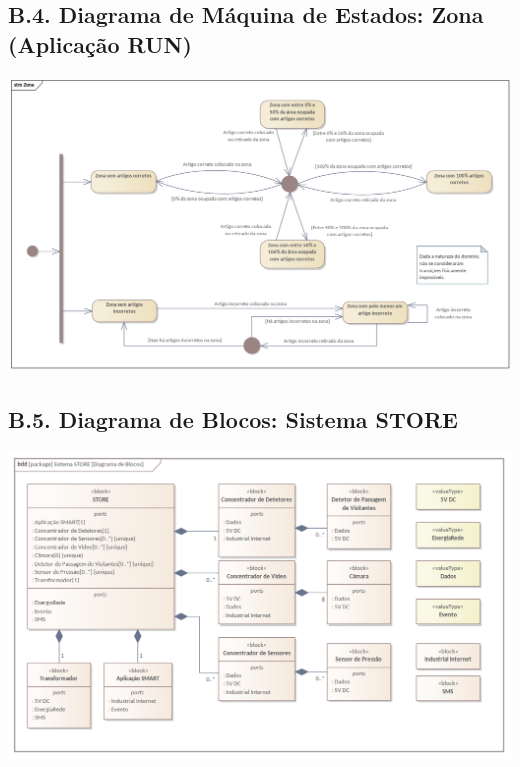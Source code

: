 \documentclass[12pt,a4paper]{article}
\begin{document}
\begin{landscape}
	\section*{B.4. Diagrama de Máquina de Estados: Zona (Aplicação RUN)}
	\includegraphics[width=1.59\textwidth]{../State_Zona.png}
\end{landscape}

\begin{landscape}
	\section*{B.5. Diagrama de Blocos: Sistema STORE}
	\includegraphics[width=1.54\textwidth]{../BDD_STORE.png}
\end{landscape}
\end{document}
